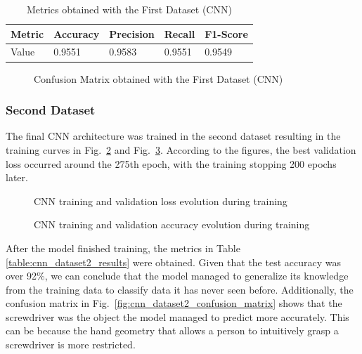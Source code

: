 \begin{table}[H]
    \centering
    \caption{Metrics obtained with the First Dataset (CNN)}
    \label{table:cnn_dataset1_results}
    \begin{tabular}{|l|l|l|l|l|}
        \hline
        Metric & Accuracy & Precision & Recall & F1-Score \\
        \hline
        Value & 0.9551 & 0.9583 & 0.9551 & 0.9549 \\
        \hline
    \end{tabular}
\end{table}

\begin{figure}[H]
    \centering
    {\fontsize{10}{12}\selectfont}
    \caption[Confusion Matrix obtained with the First Dataset (CNN)]{Confusion Matrix obtained with the First Dataset (CNN)}
    \label{fig:cnn_dataset1_conf_matrix}
\end{figure}

\subsubsection{Second Dataset}

The final CNN architecture was trained in the second dataset resulting in the training curves in Fig.~\ref{fig:cnn_loss} and Fig.~\ref{fig:cnn_acc}. According to the figures, the best validation loss occurred around the 275th epoch, with the training stopping 200 epochs later.

\begin{figure}[H]
    \centering
    {\fontsize{10}{12}\selectfont}
    \caption[CNN training and validation loss evolution during training]{CNN training and validation loss evolution during training}
    \label{fig:cnn_loss}
\end{figure}

\begin{figure}[H]
    \centering
    {\fontsize{10}{12}\selectfont}
    \caption[CNN training and validation accuracy evolution during training]{CNN training and validation accuracy evolution during training}
    \label{fig:cnn_acc}
\end{figure}

After the model finished training, the metrics in Table \ref{table:cnn_dataset2_results} were obtained. Given that the test accuracy was over 92\%, we can conclude that the model managed to generalize its knowledge from the training data to classify data it has never seen before. Additionally, the confusion matrix in Fig.~\ref{fig:cnn_dataset2_confusion_matrix} shows that the screwdriver was the object the model managed to predict more accurately. This can be because the hand geometry that allows a person to intuitively grasp a screwdriver is more restricted.

